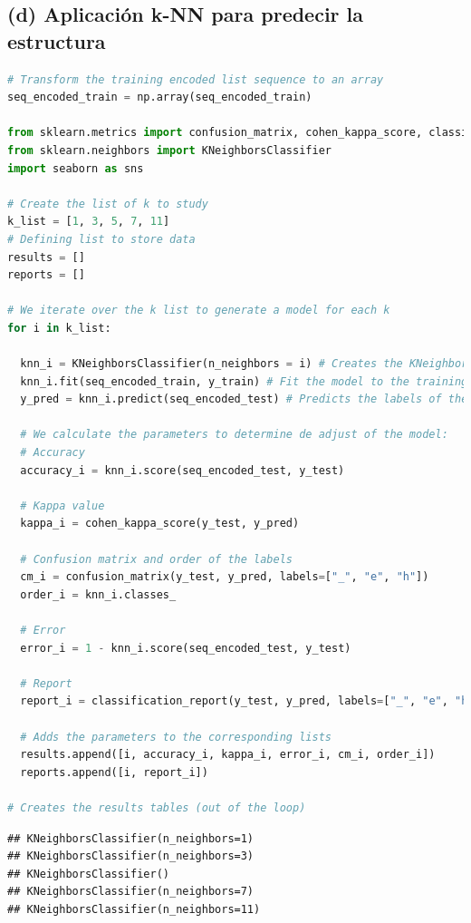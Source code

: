 \documentclass[
]{article}
\begin{document}
\hypertarget{d-aplicaciuxf3n-k-nn-para-predecir-la-estructura}{%
\subsection{(d) Aplicación k-NN para predecir la
estructura}\label{d-aplicaciuxf3n-k-nn-para-predecir-la-estructura}}

\begin{lstlisting}[language=Python]
# Transform the training encoded list sequence to an array
seq_encoded_train = np.array(seq_encoded_train)

from sklearn.metrics import confusion_matrix, cohen_kappa_score, classification_report
from sklearn.neighbors import KNeighborsClassifier
import seaborn as sns

# Create the list of k to study
k_list = [1, 3, 5, 7, 11]
# Defining list to store data
results = []
reports = []

# We iterate over the k list to generate a model for each k
for i in k_list:

  knn_i = KNeighborsClassifier(n_neighbors = i) # Creates the KNeighborsClassifier object with k=i
  knn_i.fit(seq_encoded_train, y_train) # Fit the model to the training set
  y_pred = knn_i.predict(seq_encoded_test) # Predicts the labels of the test data
  
  # We calculate the parameters to determine de adjust of the model:
  # Accuracy
  accuracy_i = knn_i.score(seq_encoded_test, y_test)
  
  # Kappa value
  kappa_i = cohen_kappa_score(y_test, y_pred)
  
  # Confusion matrix and order of the labels
  cm_i = confusion_matrix(y_test, y_pred, labels=["_", "e", "h"])
  order_i = knn_i.classes_
  
  # Error
  error_i = 1 - knn_i.score(seq_encoded_test, y_test)
  
  # Report
  report_i = classification_report(y_test, y_pred, labels=["_", "e", "h"])
  
  # Adds the parameters to the corresponding lists
  results.append([i, accuracy_i, kappa_i, error_i, cm_i, order_i])
  reports.append([i, report_i])
  
# Creates the results tables (out of the loop)
\end{lstlisting}

\begin{lstlisting}
## KNeighborsClassifier(n_neighbors=1)
## KNeighborsClassifier(n_neighbors=3)
## KNeighborsClassifier()
## KNeighborsClassifier(n_neighbors=7)
## KNeighborsClassifier(n_neighbors=11)
\end{lstlisting}
\end{document}
